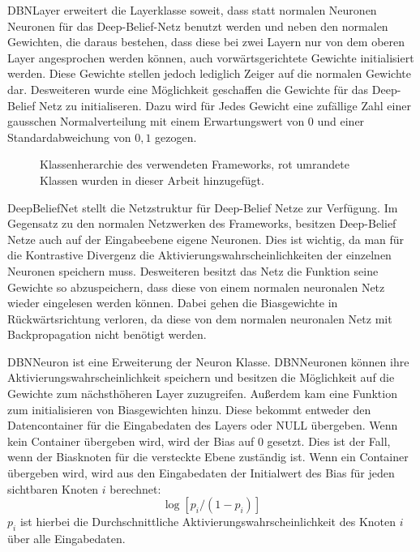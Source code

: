 \documentclass[12pt]{article}
\begin{document}
DBNLayer erweitert die Layerklasse soweit, dass statt normalen Neuronen Neuronen für das Deep-Belief-Netz benutzt werden und neben den normalen Gewichten, die daraus bestehen, dass diese bei zwei Layern nur von dem oberen Layer angesprochen werden können, auch vorwärtsgerichtete Gewichte initialisiert werden. Diese Gewichte stellen jedoch lediglich Zeiger auf die normalen Gewichte dar. Desweiteren wurde eine Möglichkeit geschaffen die Gewichte für das Deep-Belief Netz zu initialiseren. Dazu wird für Jedes Gewicht eine zufällige Zahl einer gausschen Normalverteilung mit einem Erwartungswert von 0 und einer Standardabweichung von $0,1$ gezogen.
\begin{figure}[H]
	\center
	
	\caption{Klassenherarchie des verwendeten Frameworks, rot umrandete Klassen wurden in dieser Arbeit hinzugefügt.}
	\label{Aufbau}
\end{figure}
DeepBeliefNet stellt die Netzstruktur für Deep-Belief Netze zur Verfügung. Im Gegensatz zu den normalen Netzwerken des Frameworks, besitzen Deep-Belief Netze auch auf der Eingabeebene eigene Neuronen. Dies ist wichtig, da man für die Kontrastive Divergenz die Aktivierungswahrscheinlichkeiten der einzelnen Neuronen speichern muss. Desweiteren besitzt das Netz die Funktion seine Gewichte so abzuspeichern, dass diese von einem normalen neuronalen Netz wieder eingelesen werden können. Dabei gehen die Biasgewichte in Rückwärtsrichtung verloren, da diese von dem normalen neuronalen Netz mit Backpropagation nicht benötigt werden.

DBNNeuron ist eine Erweiterung der Neuron Klasse. DBNNeuronen können ihre Aktivierungswahrscheinlichkeit speichern und besitzen die Möglichkeit auf die Gewichte zum nächsthöheren Layer zuzugreifen. Außerdem kam eine Funktion zum initialisieren von Biasgewichten hinzu. Diese bekommt entweder den Datencontainer für die Eingabedaten des Layers oder NULL übergeben. Wenn kein Container übergeben wird, wird der Bias auf 0 gesetzt. Dies ist der Fall, wenn der Biasknoten für die versteckte Ebene zuständig ist. Wenn ein Container übergeben wird, wird aus den Eingabedaten der Initialwert des Bias für jeden sichtbaren Knoten $i$ berechnet:
\begin{equation}
\log [p_i/(1-p_i)]
\end{equation}
$p_i$ ist hierbei die Durchschnittliche Aktivierungswahrscheinlichkeit des Knoten $i$ über alle Eingabedaten.
\end{document}
